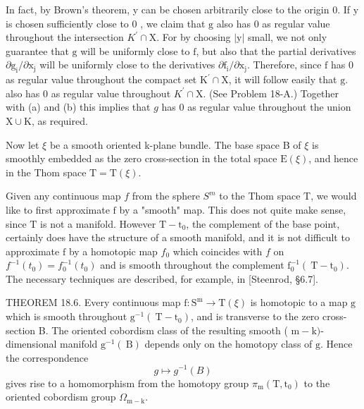 \documentclass[10pt]{article}
\begin{document}
In fact, by Brown's theorem, y can be chosen arbitrarily close to the origin 0. If $\mathrm{y}$ is chosen sufficiently close to 0 , we claim that $\mathrm{g}$ also has 0 as regular value throughout the intersection $K^{\prime} \cap \mathrm{X}$. For by choosing $|\mathrm{y}|$ small, we not only guarantee that $\mathrm{g}$ will be uniformly close to $\mathrm{f}$, but also that the partial derivatives $\partial \mathrm{g}_{\mathrm{i}} / \partial \mathrm{x}_{\mathrm{j}}$ will be uniformly close to the derivatives $\partial \mathrm{f}_{\mathrm{i}} / \partial \mathrm{x}_{\mathrm{j}}$. Therefore, since $\mathrm{f}$ has 0 as regular value throughout the compact set $\mathrm{K}^{\prime} \cap \mathrm{X}$, it will follow easily that $\mathrm{g}$. also has 0 as regular value throughout $K^{\prime} \cap \mathrm{X}$. (See Problem 18-A.) Together with (a) and (b) this implies that $g$ has 0 as regular value throughout the union $\mathrm{X} \cup \mathrm{K}$, as required.

Now let $\xi$ be a smooth oriented k-plane bundle. The base space B of $\xi$ is smoothly embedded as the zero cross-section in the total space $\mathrm{E}(\xi)$, and hence in the Thom space $\mathrm{T}=\mathrm{T}(\xi)$.

Given any continuous map $f$ from the sphere $S^{m}$ to the Thom space T, we would like to first approximate $\mathrm{f}$ by a "smooth" map. This does not quite make sense, since $\mathrm{T}$ is not a manifold. However $\mathrm{T}-\mathrm{t}_{0}$, the complement of the base point, certainly does have the structure of a smooth manifold, and it is not difficult to approximate $\mathrm{f}$ by a homotopic map $f_{0}$ which coincides with $f$ on $f^{-1}\left(t_{0}\right)=f_{0}^{-1}\left(t_{0}\right)$ and is smooth throughout the complement $\mathrm{f}_{0}^{-1}\left(\mathrm{~T}-\mathrm{t}_{0}\right)$. The necessary techniques are described, for example, in [Steenrod, §6.7].

THEOREM 18.6. Every continuous map $\mathrm{f}: \mathrm{S}^{\mathrm{m}} \rightarrow \mathrm{T}(\xi)$ is homotopic to a map $\mathrm{g}$ which is smooth throughout $\mathrm{g}^{-1}\left(\mathrm{~T}-\mathrm{t}_{0}\right)$, and is transverse to the zero cross-section B. The oriented cobordism class of the resulting smooth ( $\mathrm{m}-\mathrm{k})$-dimensional manifold $\mathrm{g}^{-1}(\mathrm{~B})$ depends only on the homotopy class of $\mathrm{g}$. Hence the correspondence
$$
g \mapsto g^{-1}(B)
$$
gives rise to a homomorphism from the homotopy group $\pi_{\mathrm{m}}\left(\mathrm{T}, \mathrm{t}_{0}\right)$ to the oriented cobordism group $\Omega_{\mathrm{m}-\mathrm{k}}$.
\end{document}
